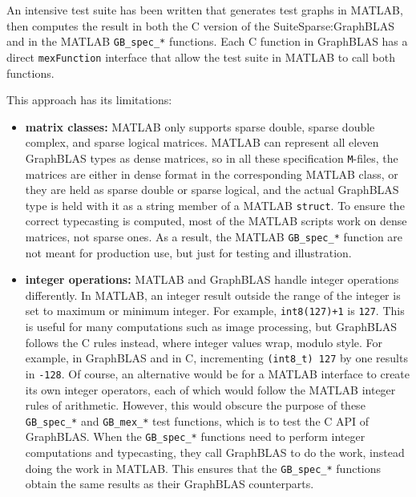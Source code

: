 \documentclass[12pt]{article}
\begin{document}
\newpage
An intensive test suite has been written that generates test graphs in MATLAB,
then computes the result in both the C version of the SuiteSparse:GraphBLAS and
in the MATLAB \verb'GB_spec_*' functions.  Each C function in GraphBLAS has
a direct \verb'mexFunction' interface that allow the test suite in MATLAB
to call both functions.

This approach has its limitations:

\begin{itemize}
\item {\bf matrix classes:} MATLAB only supports sparse double, sparse double
    complex, and sparse logical matrices.  MATLAB can represent all eleven
    GraphBLAS types as dense matrices, so in all these specification
    \verb'M'-files, the matrices are either in dense format in the
    corresponding MATLAB class, or they are held as sparse double or sparse
    logical, and the actual GraphBLAS type is held with it as a string member
    of a MATLAB \verb'struct'.  To ensure the correct typecasting is computed,
    most of the MATLAB scripts work on dense matrices, not sparse ones.  As a
    result, the MATLAB \verb'GB_spec_*' function are not meant for production
    use, but just for testing and illustration.

\item {\bf integer operations:}  MATLAB and GraphBLAS handle integer operations
    differently.  In MATLAB, an integer result outside the range of the integer
    is set to maximum or minimum integer.  For example, \verb'int8(127)+1' is
    \verb'127'.  This is useful for many computations such as image processing,
    but GraphBLAS follows the C rules instead, where integer values wrap,
    modulo style.  For example, in GraphBLAS and in C, incrementing
    \verb'(int8_t) 127' by one results in \verb'-128'.  Of course, an
    alternative would be for a MATLAB interface to create its own integer
    operators, each of which would follow the MATLAB integer rules of
    arithmetic.  However, this would obscure the purpose of these
    \verb'GB_spec_*' and \verb'GB_mex_*' test functions, which is to test the C
    API of GraphBLAS.  When the \verb'GB_spec_*' functions need to perform
    integer computations and typecasting, they call GraphBLAS to do the work,
    instead doing the work in MATLAB.  This ensures that the \verb'GB_spec_*'
    functions obtain the same results as their GraphBLAS counterparts.


\end{itemize}
\end{document}
